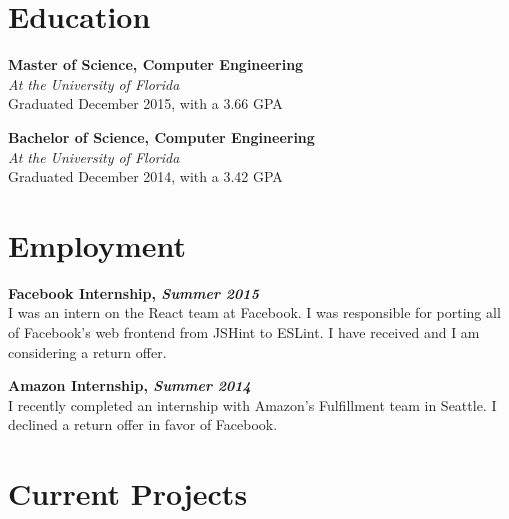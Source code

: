 \documentclass[11pt, letterpaper]{article}
\begin{document}



\section{Education}

\begin{multicols}{2}
\raggedcolumns
\textbf{Master of Science, Computer Engineering} \\
\textit{At the University of Florida} \\
Graduated December 2015, with a 3.66 GPA

\columnbreak

\textbf{Bachelor of Science, Computer Engineering} \\
\textit{At the University of Florida} \\
Graduated December 2014, with a 3.42 GPA
\end{multicols}


\section{Employment}

\begin{multicols}{2}
\raggedcolumns
\textbf{Facebook Internship, \textit{Summer 2015}} \\
I was an intern on the React team at Facebook. I was responsible for porting all
of Facebook’s web frontend from JSHint to ESLint. I have received and I am
considering a return offer.

\columnbreak

\textbf{Amazon Internship, \textit{Summer 2014}} \\
I recently completed an internship with Amazon’s Fulfillment team in Seattle.
I declined a return offer in favor of Facebook.
\end{multicols}


\section{Current Projects}

\end{document}
